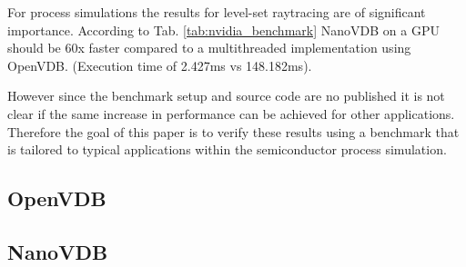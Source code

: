 For process simulations the results for level-set raytracing are of significant importance.
According to Tab. \ref{tab:nvidia_benchmark} NanoVDB on a GPU should be 60x faster compared to a multithreaded implementation using OpenVDB. (Execution time of 2.427ms vs 148.182ms).

However since the benchmark setup and source code are no published it is not clear if the same increase in performance can be achieved for other applications.
Therefore the goal of this paper is to verify these results using a benchmark that is tailored to typical applications within the semiconductor process simulation.

\subsection{OpenVDB}

\subsection{NanoVDB}


